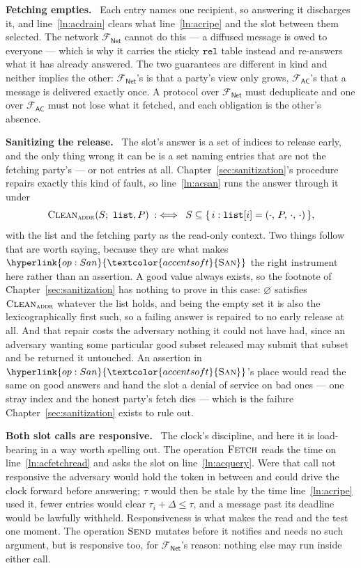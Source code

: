 \documentclass[10pt,oneside,openany]{book}
\renewcommand{\emptyset}{\varnothing}
\newcommand{\op}[1]{\textnormal{\textsc{#1}}}
\newcommand{\opl}[1]{\hyperlink{op:#1}{\textcolor{accentsoft}{\op{#1}}}}
\newcommand{\Fnet}{\mathcal{F}_{\mathsf{Net}}}
\newcommand{\Fac}{\mathcal{F}_{\mathsf{AC}}}
\newcommand{\San}{\opl{San}}
\newcommand{\Clean}{\op{Clean}}
\newcommand{\V}[1]{\mathtt{#1}}
\newcommand{\heading}[1]{\medskip\par\noindent\textcolor{accent}{\textbf{#1.}}\ }
\theoremstyle{accentdef}
\theoremstyle{accentplain}
\begin{document}
\heading{Fetching empties} Each entry names one recipient, so answering it discharges it, and
line~\ref{ln:acdrain} clears what line~\ref{ln:acripe} and the slot between them selected. The network $\Fnet$
cannot do this --- a diffused message is owed to everyone --- which is why it carries the sticky
$\V{rel}$ table instead and re-answers what it has already answered. The two guarantees are
different in kind and neither implies the other: $\Fnet$'s is that a party's view only grows,
$\Fac$'s that a message is delivered exactly once. A protocol over $\Fnet$ must deduplicate and
one over $\Fac$ must not lose what it fetched, and each obligation is the other's absence.

\heading{Sanitizing the release} The slot's answer is a set of indices to release early, and the
only thing wrong it can be is a set naming entries that are not the fetching party's --- or not
entries at all. Chapter~\ref{sec:sanitization}'s procedure repairs exactly this kind of fault, so
line~\ref{ln:acsan} runs the answer through it under
\[
  \Clean_{\op{addr}}(S;\ \V{list}, P) \;:\iff\;
  S \subseteq \{\, i : \V{list}[i] = (\cdot,\, P,\, \cdot,\, \cdot) \,\} ,
\]
with the list and the fetching party as the read-only context. Two things follow that are worth
saying, because they are what makes $\San$ the right instrument here rather than an assertion. A
good value always exists, so the footnote of Chapter~\ref{sec:sanitization} has nothing to prove
in this case: $\emptyset$ satisfies $\Clean_{\op{addr}}$ whatever the list holds, and being the
empty set it is also the lexicographically first such, so a failing answer is repaired to no
early release at all. And that repair costs the adversary nothing it could not have had, since an
adversary wanting some particular good subset released may submit that subset and be returned it
untouched. An assertion in $\San$'s place would read the same on good answers and hand the slot a
denial of service on bad ones --- one stray index and the honest party's fetch dies --- which is
the failure Chapter~\ref{sec:sanitization} exists to rule out.

\heading{Both slot calls are responsive} The clock's discipline, and here it is load-bearing in a
way worth spelling out. The operation $\op{Fetch}$ reads the time on line~\ref{ln:acfetchread} and asks the slot
on line~\ref{ln:acquery}. Were that call not responsive the adversary would hold the token in
between and could drive the clock forward before answering; $\tau$ would then be stale by the time
line~\ref{ln:acripe} used it, fewer entries would clear $\tau_i + \Delta \leq \tau$, and a message
past its deadline would be lawfully withheld. Responsiveness is what makes the read and the test
one moment. The operation $\op{Send}$ mutates before it notifies and needs no such argument, but is responsive
too, for $\Fnet$'s reason: nothing else may run inside either call.
\end{document}
